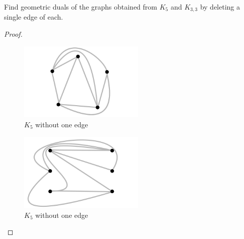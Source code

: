 \prob
{
    Find geometric duals of the graphs obtained from $K_5$ and $K_{3,3}$ by
    deleting a single edge of each.
}
\begin{proof}$\,$\pn
    \begin{figure}[H]
        \begin{center}
        \includegraphics[width=6cm]{Test2/Problem9/PlanarK5WithoutOneEdge.png}
        \end{center}                            
        \caption{$K_5$ without one edge}
        \label{t2:p9_PlanarK5WithoutOneEdge.png}                        
    \end{figure}\pn    
    
    \begin{figure}[H]
        \begin{center}
        \includegraphics[width=6cm]{Test2/Problem9/PlanarK3_3WithoutOneEdge.png}
        \end{center}                            
        \caption{$K_5$ without one edge}
        \label{t2:p9_PlanarK3_3WithoutOneEdge.png}                        
    \end{figure}\pn
\end{proof}